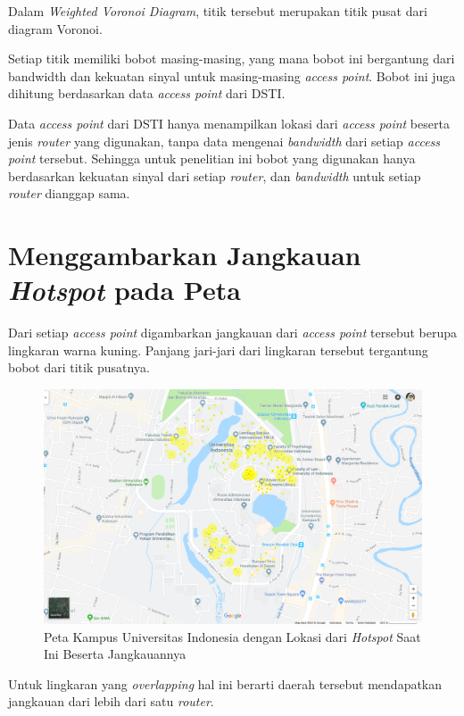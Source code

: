 Dalam \textit{Weighted Voronoi Diagram}, titik tersebut merupakan titik pusat dari diagram Voronoi. 

Setiap titik memiliki bobot masing-masing, yang mana bobot ini bergantung dari bandwidth dan kekuatan sinyal untuk masing-masing \textit{access point}. Bobot ini juga dihitung berdasarkan data \textit{access point} dari DSTI. 

Data \textit{access point} dari DSTI hanya menampilkan lokasi dari \textit{access point} beserta jenis \textit{router} yang digunakan, tanpa data mengenai \textit{bandwidth} dari setiap \textit{access point} tersebut. Sehingga untuk penelitian ini bobot yang digunakan hanya berdasarkan kekuatan sinyal dari setiap \textit{router}, dan \textit{bandwidth} untuk setiap \textit{router} dianggap sama.

\section{Menggambarkan Jangkauan \textit{Hotspot} pada Peta}

Dari setiap \textit{access point} digambarkan jangkauan dari \textit{access point} tersebut berupa lingkaran warna kuning. Panjang jari-jari dari lingkaran tersebut tergantung bobot dari titik pusatnya.

\begin{figure}
	\centering
	\includegraphics[width=14cm]{pics/ui-coverage.png}
	\caption{Peta Kampus Universitas Indonesia dengan Lokasi dari \textit{Hotspot} Saat Ini Beserta Jangkauannya}
	\label{fig:uiCoverage}
\end{figure} 

Untuk lingkaran yang \textit{overlapping} hal ini berarti daerah tersebut mendapatkan jangkauan dari lebih dari satu \textit{router}.

